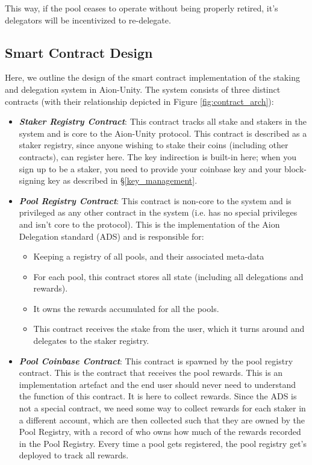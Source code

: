 This way, if the pool ceases to operate without being properly retired, it's delegators will be incentivized to re-delegate. 


\subsection{Smart Contract Design} 
Here, we outline the design of the smart contract implementation of the staking and delegation system in Aion-Unity. The system consists of three distinct contracts (with their relationship depicted in Figure \ref{fig:contract_arch}):
\begin{itemize}
    \item \textbf{\textit{Staker Registry Contract}}: This contract tracks all stake and stakers in the system and is core to the Aion-Unity protocol. This contract is described as a staker registry, since anyone wishing to stake their coins (including other contracts), can register here. The key indirection is built-in here; when you sign up to be a staker, you need to provide your coinbase key and your block-signing key as described in \S\ref{key_management}. 
    \item \textbf{\textit{Pool Registry Contract}}: This contract is non-core to the system and is privileged as any other contract in the system (i.e. has no special privileges and isn't core to the protocol). This is the implementation of the Aion Delegation standard (ADS) and is responsible for: 
    \begin{itemize}[label=--,nosep]
        \item Keeping a registry of all pools, and their associated meta-data
        \item For each pool, this contract stores all state (including all delegations and rewards).
        \item It owns the rewards accumulated for all the pools.
        \item This contract receives the stake from the user, which it turns around and delegates to the staker registry. 
    \end{itemize}
    \item \textbf{\textit{Pool Coinbase Contract}}: This contract is spawned by the pool registry contract. This is the contract that receives the pool rewards. This is an implementation artefact and the end user should never need to understand the function of this contract. It is here to collect rewards. Since the ADS is not a special contract, we need some way to collect rewards for each staker in a different account, which are then collected such that they are owned by the Pool Registry, with a record of who owns how much of the rewards recorded in the Pool Registry. Every time a pool gets registered, the pool registry get's deployed to track all rewards. 
\end{itemize}

